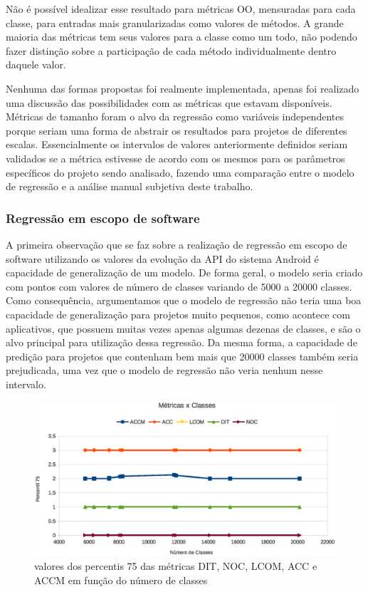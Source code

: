 Não é possível idealizar esse resultado para métricas OO, mensuradas para cada classe, para entradas mais granularizadas como valores de métodos. A grande maioria das métricas tem seus valores para a classe como um todo, não podendo fazer distinção sobre a participação de cada método individualmente dentro daquele valor.

Nenhuma das formas propostas foi realmente implementada, apenas foi realizado uma discussão das possibilidades com as métricas que estavam disponíveis. Métricas de tamanho foram o alvo da regressão como variáveis independentes porque seriam uma forma de abstrair os resultados para projetos de diferentes escalas. Essencialmente os intervalos de valores anteriormente definidos seriam validados se a métrica estivesse de acordo com os mesmos para os parâmetros específicos do projeto sendo analisado, fazendo uma comparação entre o modelo de regressão e a análise manual subjetiva deste trabalho.

\subsubsection{Regressão em escopo de software}

A primeira observação que se faz sobre a realização de regressão em escopo de software utilizando os valores da evolução da API do sistema Android é capacidade de generalização de um modelo. De forma geral, o modelo seria criado com pontos com valores de número de classes variando de 5000 a 20000 classes. Como consequência, argumentamos que o modelo de regressão não teria uma boa capacidade de generalização para projetos muito pequenos, como acontece com aplicativos, que possuem muitas vezes apenas algumas dezenas de classes, e são o alvo principal para utilização dessa regressão. Da mesma forma, a capacidade de predição para projetos que contenham bem mais que 20000 classes também seria prejudicada, uma vez que o modelo de regressão não veria nenhum nesse intervalo. 

\begin{figure}[!htb]
\centering
\includegraphics [keepaspectratio=true,scale=0.7]{figuras/metricasxclasses.eps}
\caption{valores dos percentis 75 das métricas DIT, NOC, LCOM, ACC e ACCM em função do número de classes}
\label{fig:metricasxclasses}
\end{figure}


